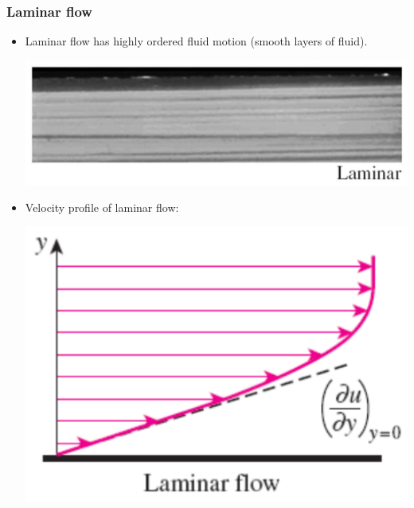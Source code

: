 \documentclass[11pt]{article}
\begin{document}
\subsubsection{Laminar flow}
\label{sec:org5e60c77}
\begin{itemize}
\item Laminar flow has highly ordered fluid motion (smooth layers of fluid).
\begin{center}
\includegraphics[width=.9\linewidth]{./images/laminar-flow-photo.png}
\end{center}
\item Velocity profile of laminar flow:
\begin{center}
\includegraphics[width=.9\linewidth]{./images/laminar-flow-graph.png}
\end{center}
\end{itemize}

 \newpage
\end{document}
